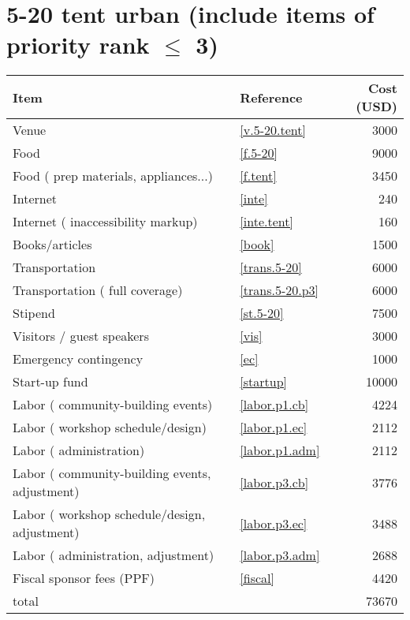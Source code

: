 \section*{5-20 tent urban (include items of priority rank $\leq$ 3)}
\begin{center}
\begin{tabular}{llr}
Item & Reference & Cost (USD) \\ \hline
Venue & \ref{v.5-20.tent} & 3000 \\
Food & \ref{f.5-20} & 9000 \\
Food ( prep materials, appliances...) & \ref{f.tent} & 3450 \\
Internet & \ref{inte} & 240 \\
Internet ( inaccessibility markup) & \ref{inte.tent} & 160 \\
Books/articles & \ref{book} & 1500 \\
Transportation & \ref{trans.5-20} & 6000 \\
Transportation ( full coverage) & \ref{trans.5-20.p3} & 6000 \\
Stipend & \ref{st.5-20} & 7500 \\
Visitors / guest speakers & \ref{vis} & 3000 \\
Emergency contingency & \ref{ec} & 1000 \\
Start-up fund & \ref{startup} & 10000 \\
Labor ( community-building events) & \ref{labor.p1.cb} & 4224 \\
Labor ( workshop schedule/design) & \ref{labor.p1.ec} & 2112 \\
Labor ( administration) & \ref{labor.p1.adm} & 2112 \\
Labor ( community-building events, adjustment) & \ref{labor.p3.cb} & 3776 \\
Labor ( workshop schedule/design, adjustment) & \ref{labor.p3.ec} & 3488 \\
Labor ( administration, adjustment) & \ref{labor.p3.adm} & 2688 \\
Fiscal sponsor fees (PPF) & \ref{fiscal} & 4420 \\ \hline
total &  & 73670
\end{tabular}
\end{center}
\newpage
